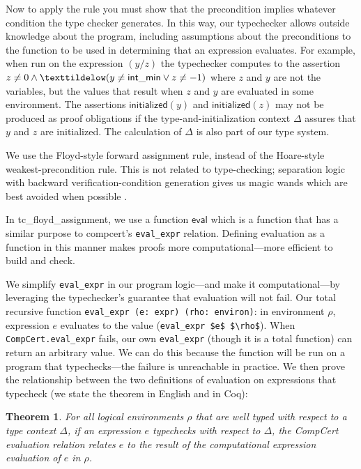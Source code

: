 \documentclass{puthesis}
\begin{document}
Now to apply the rule you must show that the precondition implies
whatever condition the type checker generates. In this way, our
typechecker allows outside knowledge about the program, including
assumptions about the preconditions to the function to be used in
determining that an expression evaluates. 
For example, when run on
the expression $(y/z)$ the typechecker computes to the assertion $z \not= 0 
\wedge \texttildelow(y \not= \mathsf{int\_min} \vee
z \not= -1)$ where $z$ and $y$ are not the variables, but the values that
result when $z$ and $y$ are evaluated in some environment. The assertions
$\mathsf{initialized}(y)$ and $\mathsf{initialized}(z)$ may not be produced as
proof obligations if the type-and-initialization context $\Delta$ assures that
$y$ and $z$ are initialized.
The calculation of $\Delta$ is also part of our type system.

We use the Floyd-style forward assignment rule,
instead of the Hoare-style weakest-precondition rule.
This is not related to type-checking; separation logic 
with backward verification-condition generation gives us magic wands which are
best avoided when possible \cite{berdine05:symbolic}.

In tc\_floyd\_assignment, we use a function $\mathsf{eval}$ which is a
function that has a similar purpose to compcert's
\lstinline|eval_expr| relation.  Defining evaluation as a function in
this manner makes proofs more computational---more efficient to build
and check.

We simplify \lstinline|eval_expr| in our program logic---and make it
computational---by leveraging the typechecker's guarantee that
evaluation will not fail.  Our total recursive function
\lstinline|eval_expr (e: expr) (rho: environ)|: in environment $\rho$,
expression $e$ evaluates to the value 
(\lstinline|eval_expr $e$ $\rho$|).  When \lstinline{CompCert.eval_expr} fails, our own
\lstinline{eval_expr} (though it is a total function) can return an
arbitrary value.  We can do this because the function will be run on a
program that typechecks---the failure is unreachable in practice. We
then prove the relationship between the two definitions of evaluation
on expressions that typecheck (we state the theorem in English and in
Coq):
\newtheorem{eval_expr_relate}{Theorem}
\begin{eval_expr_relate}
For all logical environments $\rho$ that are well typed with respect to a type
context $\Delta$, if an expression $e$ typechecks with respect to $\Delta$, the
CompCert evaluation relation relates $e$ to the result of the computational
expression evaluation of $e$ in $\rho$. 
\end{eval_expr_relate}
\end{document}
